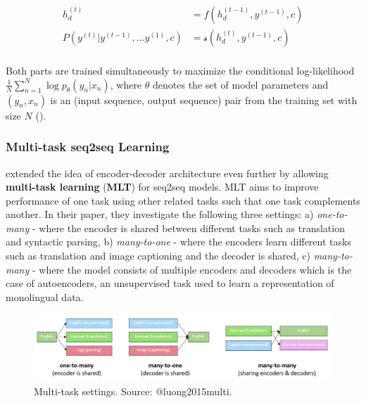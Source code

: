 \documentclass[]{krantz}
\begin{document}
\begin{align}
h_{d}^{(t)} & = f(h_{d}^{(t-1)},y^{(t-1)},c) \label{eq:decoder-hidden} \\
P(y^{(t)}|y^{(t-1)},...y^{(1)},c) & = \mathcal{s}(h_{d}^{(t)},y^{(t-1)},c) \label{eq:decoder-output} \\
\end{align}

Both parts are trained simultaneously to maximize the conditional log-likelihood \(\frac{1}{N}\sum_{n=1}^{N}\log{p_{\theta}(y_{n}|x_{n})}\), where \(\theta\) denotes the set of model parameters and \((y_{n},x_{n})\) is an (input sequence, output sequence) pair from the training set with size \(N\) (\citet{cho2014learning}).

\hypertarget{multi-task-seq2seq-learning}{%
\subsubsection{Multi-task seq2seq Learning}\label{multi-task-seq2seq-learning}}

\citet{luong2015multi} extended the idea of encoder-decoder architecture even further by allowing \textbf{multi-task learning} (\textbf{MLT}) for seq2seq models. MLT aims to improve performance of one task using other related tasks such that one task complements another. In their paper, they investigate the following three settings: a) \emph{one-to-many} - where the encoder is shared between different tasks such as translation and syntactic parsing, b) \emph{many-to-one} - where the encoders learn different tasks such as translation and image captioning and the decoder is shared, c) \emph{many-to-many} - where the model consists of multiple encoders and decoders which is the case of autoencoders, an unsupervised task used to learn a representation of monolingual data.

\begin{figure}

{\centering \includegraphics[width=1\linewidth]{figures/01-02-rnns-and-their-applications-in-nlp/4_multitask_seq2seq} 

}

\caption{Multi-task settings. Source: @luong2015multi.}\label{fig:01-02-multi-task-seq2seq}
\end{figure}
\end{document}

